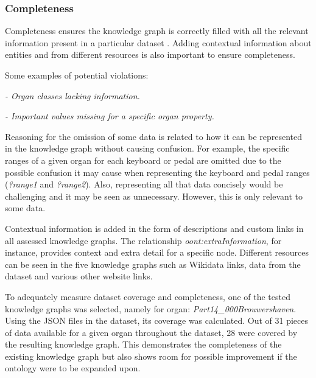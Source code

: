 \subsubsection{Completeness}
\hspace{0.5cm} Completeness ensures the knowledge graph is correctly filled with all the relevant information present in a particular dataset \cite{knowledgegraphevaulationbook}. Adding contextual information about entities and from different resources \cite{evaluationpaper} is also important to ensure completeness. 

\noindent Some examples of potential violations:

\vspace{-0.15cm}
\begin{displayquote}
    \textit{- Organ classes lacking information.}
\end{displayquote}
\vspace{-0.6cm}
\begin{displayquote}
    \textit{- Important values missing for a specific organ property.}
\end{displayquote}
\vspace{-0.1cm}

Reasoning for the omission of some data is related to how it can be represented in the knowledge graph without causing confusion. For example, the specific ranges of a given organ for each keyboard or pedal are omitted due to the possible confusion it may cause when representing the keyboard and pedal ranges (\textit{?range1} and \textit{?range2}). Also, representing all that data concisely would be challenging and it may be seen as unnecessary. However, this is only relevant to some data. 

Contextual information is added in the form of descriptions and custom links in all assessed knowledge graphs. The relationship \textit{oont:extraInformation}, for instance, provides context and extra detail for a specific node. Different resources can be seen in the five knowledge graphs such as Wikidata links, data from the dataset and various other website links. 

To adequately measure dataset coverage and completeness, one of the tested knowledge graphs was selected, namely for organ: \textit{Part14\_000Brouwershaven}. Using the JSON files in the dataset, its coverage was calculated. Out of 31 pieces of data available for a given organ throughout the dataset, 28 were covered by the resulting knowledge graph. This demonstrates the completeness of the existing knowledge graph but also shows room for possible improvement if the ontology were to be expanded upon. 

